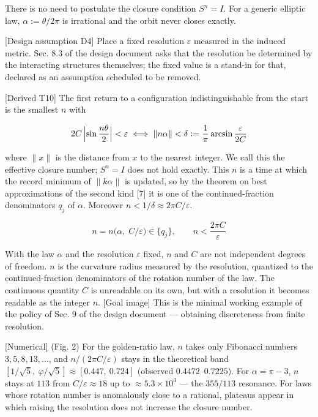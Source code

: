 \documentclass[
  a4paper,
]{article}
\begin{document}
There is no need to postulate the closure condition \(S^n=I\). For a
generic elliptic law, \(\alpha:=\theta/2\pi\) is irrational and the
orbit never closes exactly.

{[}Design assumption D4{]} Place a fixed resolution \(\varepsilon\)
measured in the induced metric. Sec. 8.3 of the design document asks
that the resolution be determined by the interacting structures
themselves; the fixed value is a stand-in for that, declared as an
assumption scheduled to be removed.

{[}Derived T10{]} The first return to a configuration indistinguishable
from the start is the smallest \(n\) with

\[
2C\,\Bigl\lvert\sin\frac{n\theta}{2}\Bigr\rvert<\varepsilon\iff\|n\alpha\|<\delta:=\frac1\pi\arcsin\frac{\varepsilon}{2C}
\]

where \(\|x\|\) is the distance from \(x\) to the nearest integer. We
call this the effective closure number; \(S^n=I\) does not hold exactly.
This \(n\) is a time at which the record minimum of \(\|k\alpha\|\) is
updated, so by the theorem on best approximations of the second kind
{[}7{]} it is one of the continued-fraction denominators \(q_j\) of
\(\alpha\). Moreover \(n<1/\delta\approx2\pi C/\varepsilon\).

\[
\boxed{\;n=n\bigl(\alpha,\;C/\varepsilon\bigr)\in\{q_j\},\qquad n<\frac{2\pi C}{\varepsilon}\;}
\]

With the law \(\alpha\) and the resolution \(\varepsilon\) fixed, \(n\)
and \(C\) are not independent degrees of freedom. \(n\) is the curvature
radius measured by the resolution, quantized to the continued-fraction
denominators of the rotation number of the law. The continuous quantity
\(C\) is unreadable on its own, but with a resolution it becomes
readable as the integer \(n\). {[}Goal image{]} This is the minimal
working example of the policy of Sec. 9 of the design document ---
obtaining discreteness from finite resolution.

{[}Numerical{]} (Fig. 2) For the golden-ratio law, \(n\) takes only
Fibonacci numbers \(3,5,8,13,\dots\), and \(n/(2\pi C/\varepsilon)\)
stays in the theoretical band
\([1/\sqrt5,\ \varphi/\sqrt5]\approx[0.447,\ 0.724]\) (observed
\(0.4472\)--\(0.7225\)). For \(\alpha=\pi-3\), \(n\) stays at \(113\)
from \(C/\varepsilon\approx18\) up to \(\approx5.3\times10^{3}\) --- the
\(355/113\) resonance. For laws whose rotation number is anomalously
close to a rational, plateaus appear in which raising the resolution
does not increase the closure number.
\end{document}
